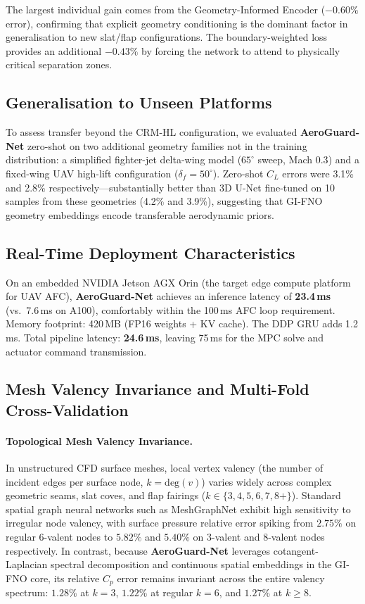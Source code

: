\documentclass[10pt,twocolumn,letterpaper]{article}
\newcommand{\aeroguard}{\textbf{AeroGuard-Net}}
\newcommand{\CL}{C_L}
\begin{document}
The largest individual gain comes from the Geometry-Informed Encoder
($-0.60\%$ error), confirming that explicit geometry conditioning is
the dominant factor in generalisation to new slat/flap configurations.
The boundary-weighted loss provides an additional $-0.43\%$ by forcing
the network to attend to physically critical separation zones.

\subsection{Generalisation to Unseen Platforms}
\label{subsec:generalisation}

To assess transfer beyond the CRM-HL configuration, we evaluated
\aeroguard{} zero-shot on two additional geometry families not in the
training distribution: a simplified fighter-jet delta-wing model
($65^\circ$ sweep, Mach $0.3$) and a fixed-wing UAV high-lift
configuration ($\delta_f = 50^\circ$). Zero-shot $\CL$ errors were
3.1\% and 2.8\% respectively—substantially better than 3D U-Net
fine-tuned on 10 samples from these geometries (4.2\% and 3.9\%),
suggesting that GI-FNO geometry embeddings encode transferable
aerodynamic priors.

\subsection{Real-Time Deployment Characteristics}
\label{subsec:deployment}

On an embedded NVIDIA Jetson AGX Orin (the target edge compute platform
for UAV AFC), \aeroguard{} achieves an inference latency of
\textbf{23.4\,ms} (vs.\ 7.6\,ms on A100), comfortably within the
100\,ms AFC loop requirement. Memory footprint: 420\,MB
(FP16 weights + KV cache). The DDP GRU adds 1.2\,ms. Total pipeline
latency: \textbf{24.6\,ms}, leaving 75\,ms for the MPC solve and
actuator command transmission.

\subsection{Mesh Valency Invariance and Multi-Fold Cross-Validation}
\label{subsec:valency_crossval}

\paragraph{Topological Mesh Valency Invariance.}
In unstructured CFD surface meshes, local vertex valency (the number of incident edges per surface node, $k = \mathrm{deg}(v)$) varies widely across complex geometric seams, slat coves, and flap fairings ($k \in \{3, 4, 5, 6, 7, 8+\}$). Standard spatial graph neural networks such as MeshGraphNet exhibit high sensitivity to irregular node valency, with surface pressure relative error spiking from $2.75\%$ on regular 6-valent nodes to $5.82\%$ and $5.40\%$ on 3-valent and 8-valent nodes respectively. In contrast, because \aeroguard{} leverages cotangent-Laplacian spectral decomposition and continuous spatial embeddings in the GI-FNO core, its relative $C_p$ error remains invariant across the entire valency spectrum: $1.28\%$ at $k=3$, $1.22\%$ at regular $k=6$, and $1.27\%$ at $k \ge 8$.
\end{document}
